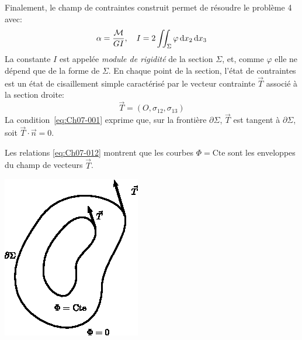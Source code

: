 Finalement, le champ de contraintes construit permet de résoudre le problème 4 avec:
\begin{equation}
    \alpha = \frac{\mathcal{M}}{GI},\quad I = 2 \iint_{\Sigma} \varphi \mathop{\mathrm{{}d}}\mathopen{} x_2 \mathop{\mathrm{{}d}}\mathopen{} x_3
    \label{eq:Ch07-064} 
\end{equation}
La constante $I$ est appelée \emph{module de rigidité} de la section $\Sigma$, et, comme $\varphi$ elle ne dépend que de la forme de $\Sigma$. En chaque point de la section, l'état de contraintes est un état de cisaillement simple caractérisé par le vecteur contrainte $\vec{T}$ associé à la section droite:
\begin{equation}
    \vec{T} = \left( O, \sigma_{12}, \sigma_{13} \right)
    \label{eq:Ch07-065} 
\end{equation}
La condition~\eqref{eq:Ch07-001} exprime que, sur la frontière $\partial \Sigma$, $\vec{T}$ est tangent à $\partial \Sigma$, soit $\vec{T} \cdot \vec{n} = 0$.
\begin{multicols}{2}
    Les relations \eqref{eq:Ch07-012} montrent que les courbes $\Phi = \text{Cte}$ sont les enveloppes du champ de vecteurs $\vec{T}$.
    \columnbreak
    \begin{center}
        \includegraphics{../images/T1_Ch07-15}
    \end{center}
\end{multicols}

